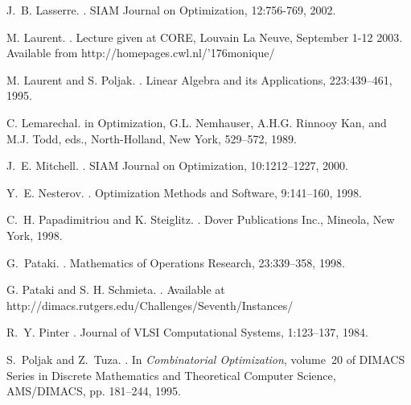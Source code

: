 \documentclass[12pt]{article}
\newcommand{\til}{\char '176}
\begin{document}
\begin{thebibliography}{10}
J.~B. Lasserre.
.
\newblock SIAM Journal on Optimization, 12:756-769, 2002.

M. Laurent.
.
\newblock Lecture given at CORE, Louvain La Neuve, September 1-12
2003. Available from http://homepages.cwl.nl/\til monique/

M. Laurent and S. Poljak.
.
\newblock Linear Algebra and its Applications, 223:439--461, 1995.

C. Lemarechal.
\newblock in Optimization, G.L. Nemhauser, A.H.G. Rinnooy Kan, and M.J.
Todd, eds., North-Holland, New York, 529--572, 1989.

J.~E. Mitchell.
.
\newblock SIAM Journal on Optimization, 10:1212--1227, 2000.

Y.~E. Nesterov.
.
\newblock Optimization Methods and Software, 9:141--160, 1998.

C.~H. Papadimitriou and K. Steiglitz.
.
\newblock Dover Publications Inc., Mineola, New York, 1998.

G.~Pataki.
.
\newblock Mathematics of Operations Research, 23:339--358, 1998.

G. Pataki and S. H. Schmieta.
.
\newblock Available at
http://dimacs.rutgers.edu/Challenges/Seventh/Instances/

R.~Y. Pinter
.
\newblock Journal of VLSI Computational Systems, 1:123--137, 1984.

S.~Poljak and Z.~Tuza.
.
\newblock In {\em Combinatorial Optimization}, volume~20 of DIMACS Series
  in Discrete Mathematics and Theoretical Computer Science, AMS/DIMACS, pp.
  181--244, 1995.


\end{thebibliography}
\end{document}
